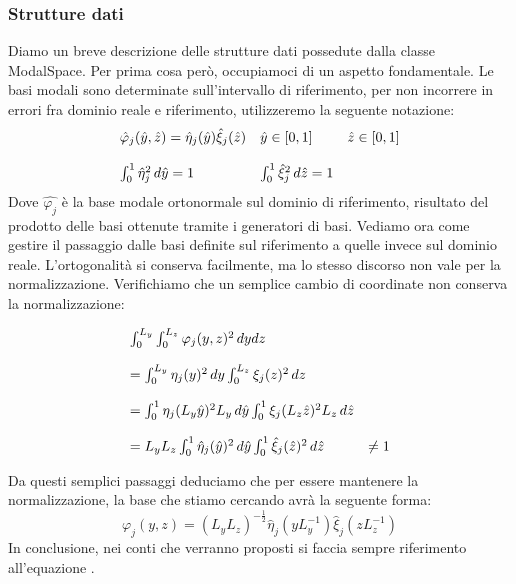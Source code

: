 \subsubsection{Strutture dati}
Diamo un breve descrizione delle strutture dati possedute dalla classe ModalSpace. Per prima cosa per\`o, occupiamoci di un aspetto fondamentale. Le basi modali sono determinate sull'intervallo di riferimento, per non incorrere in errori fra dominio reale e riferimento,  utilizzeremo la seguente notazione:
\begin{equation}
\label{eq: notazione}
\begin{array}{l l l}
\hat{\varphi}_j(\hat{y},\hat{z}) = \hat{\eta}_j(\hat{y}) \hat{\xi}_j(\hat{z}) & \hat{y} \in [0,1] & \hat{z} \in [0,1] 
\\
\\
\int_0^1 \hat{\eta}^2_j\,d\hat{y} = 1 & \int_0^1 \hat{\xi}^2_j\,d\hat{z} = 1
\end{array}
\end{equation}
Dove $\hat{\varphi_j}$ \`e la base modale ortonormale sul dominio di riferimento, risultato del prodotto delle basi ottenute tramite i generatori di basi.
Vediamo ora come gestire il passaggio dalle basi definite sul riferimento a quelle invece sul dominio reale. L'ortogonalit\`a si conserva facilmente, ma lo stesso discorso non vale per la normalizzazione. Verifichiamo che un semplice cambio di coordinate non conserva la normalizzazione:

\begin{equation}
\label{eq: trasformazione}
\begin{array}{l l }
\int_0^{L_y}\int_0^{L_z} \varphi_j(y,z)^2 \,dydz 
\\
\\
= \int_0^{L_y} \eta_j(y)^2 \,dy\int_0^{L_z} \xi_j(z)^2 \,dz 
\\
\\
= \int_0^{1} \eta_j(L_y\hat{y})^2 L_y\,d\hat{y} \int_0^{1} \xi_j(L_z\hat{z})^2 L_z\,d\hat{z} 
\\
\\
 = L_yL_z\int_0^{1} \hat{\eta}_j(\hat{y})^2 \,d\hat{y} \int_0^{1} \hat{\xi}_j(\hat{z})^2 \,d\hat{z} & \neq  1  
\end{array}
\end{equation}

Da questi semplici passaggi deduciamo che per essere mantenere la normalizzazione, la base che stiamo cercando avr\`a la seguente forma:
\begin{equation}
\label{eq: base sul dominio corrente}
\varphi_j(y,z) = (L_yL_z)^{-\frac{1}{2}}\hat{\eta}_j(yL_y^{-1})\hat{\xi}_j(zL_z^{-1})
\end{equation}
In conclusione, nei conti che verranno proposti si faccia sempre riferimento all'equazione .

